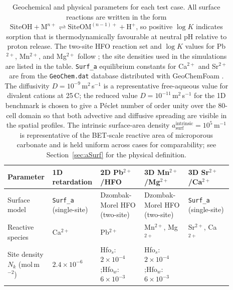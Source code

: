 \begin{table}[htbp]
    \centering
    \caption{Geochemical and physical parameters for each test case.
    All surface reactions are written in the form
    $\mathrm{SiteOH} + \mathrm{M}^{n+} \rightleftharpoons \mathrm{SiteOM}^{(n-1)+} + \mathrm{H}^+$,
    so positive $\log K$ indicates sorption that is thermodynamically
    favourable at neutral pH relative to proton release.
    The two-site HFO reaction set and $\log K$ values for Pb$^{2+}$,
    Mn$^{2+}$, and Mg$^{2+}$ follow \citet{dzombak1990surface}; the site
    densities used in the simulations are listed in the table.
    \texttt{Surf\_a} equilibrium constants for Ca$^{2+}$ and
    Sr$^{2+}$ are from the \texttt{GeoChem.dat} database distributed with
    GeoChemFoam \citep{maes2021geochemfoam,parkhurst2013phreeqc}.
    The diffusivity $D = 10^{-9}$\,m$^2$\,s$^{-1}$ is a representative
    free-aqueous value for divalent cations at 25\,\textdegree{}C; the reduced
    value $D = 10^{-11}$\,m$^2$\,s$^{-1}$ for the 1D benchmark is chosen to
    give a P\'{e}clet number of order unity over the 80-cell domain so that
    both advective and diffusive spreading are visible in the spatial profiles.
    The intrinsic surface-area density $a_{\mathrm{surf}}^{\mathrm{intrinsic}} = 10^{5}$\,m$^{-1}$
    is representative of the BET-scale reactive area of microporous carbonate
    \citep{menke2021upscaling} and is held uniform across cases for
    comparability; see Section~\ref{sec:aSurf} for the physical definition.}
    \label{tab:chemParams}
    \scriptsize
    \setlength{\tabcolsep}{2pt}
    \begin{tabular}{@{}p{0.13\linewidth}p{0.19\linewidth}p{0.19\linewidth}p{0.19\linewidth}p{0.19\linewidth}@{}}
        \toprule
        Parameter
            & 1D retardation
            & 2D Pb$^{2+}$/HFO
            & 3D Mn$^{2+}$/Mg$^{2+}$
            & 3D Sr$^{2+}$/Ca$^{2+}$ \\
        \midrule
        Surface model
            & \texttt{Surf\_a} (single-site)
            & Dzombak-Morel HFO (two-site)
            & Dzombak-Morel HFO (two-site)
            & \texttt{Surf\_a} (single-site) \\
        Reactive species
            & Ca$^{2+}$
            & Pb$^{2+}$
            & Mn$^{2+}$, Mg$^{2+}$
            & Sr$^{2+}$, Ca$^{2+}$ \\
        Site density $N_k$ (mol\,m$^{-2}$)
            & $2.4\times10^{-6}$
            & Hfo$_s$: $2\times10^{-4}$;\enspace Hfo$_w$: $6\times10^{-3}$
            & Hfo$_s$: $2\times10^{-4}$;\enspace Hfo$_w$: $6\times10^{-3}$

\end{tabular}
\end{table}
